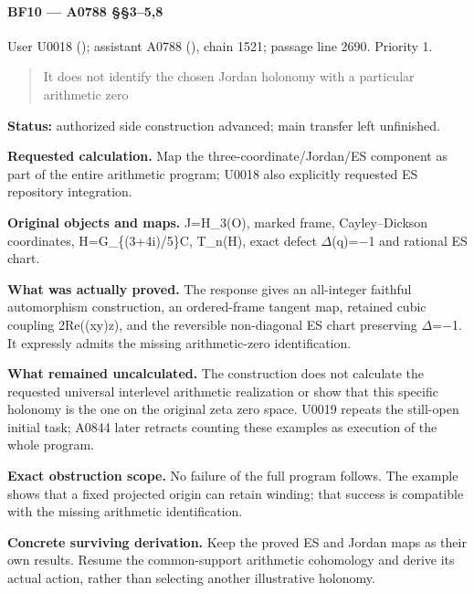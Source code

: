 \paragraph{BF10 --- A0788 §§3--5,8}\label{bf10-a0788-358}

User U0018 (\protect{});
assistant A0788 (\protect{}),
chain 1521; passage line 2690. Priority 1.

\begin{quote}
It does not identify the chosen Jordan holonomy with a particular
arithmetic zero
\end{quote}

\textbf{Status:} authorized side construction advanced; main transfer
left unfinished.

\textbf{Requested calculation.} Map the three-coordinate/Jordan/ES
component as part of the entire arithmetic program; U0018 also
explicitly requested ES repository integration.

\textbf{Original objects and maps.} J=H\_3(O), marked frame,
Cayley--Dickson coordinates, H=G\_\{(3+4i)/5\}C, T\_n(H), exact defect
\allowbreak{}\ensuremath{Δ}\allowbreak{}(q)=\allowbreak{}\ensuremath{−}\allowbreak{}1
and rational ES chart.

\textbf{What was actually proved.} The response gives an all-integer
faithful automorphism construction, an ordered-frame tangent map,
retained cubic coupling 2Re((xy)z), and the reversible non-diagonal ES
chart preserving
\allowbreak{}\ensuremath{Δ}\allowbreak{}=\allowbreak{}\ensuremath{−}\allowbreak{}1.
It expressly admits the missing arithmetic-zero identification.

\textbf{What remained uncalculated.} The construction does not calculate
the requested universal interlevel arithmetic realization or show that
this specific holonomy is the one on the original zeta zero space. U0019
repeats the still-open initial task; A0844 later retracts counting these
examples as execution of the whole program.

\textbf{Exact obstruction scope.} No failure of the full program
follows. The example shows that a fixed projected origin can retain
winding; that success is compatible with the missing arithmetic
identification.

\textbf{Concrete surviving derivation.} Keep the proved ES and Jordan
maps as their own results. Resume the common-support arithmetic
cohomology and derive its actual action, rather than selecting another
illustrative holonomy.

